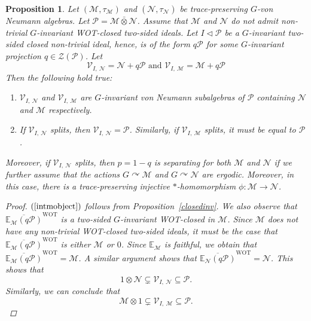 \documentclass[12pt]{amsart}
\newtheorem{proposition}[thm]{Proposition}
\theoremstyle{definition}
\begin{document}
\begin{proposition}
\label{objectassociatedwithanideal}
Let $(\mathcal{M},\tau_{\mathcal{M}})$ and $(\mathcal{N},\tau_{\mathcal{N}})$ be trace-preserving $G$-von Neumann algebras. Let $\mathcal{P}=\mathcal{M}\bar{\otimes}\mathcal{N}$. Assume that $\mathcal{M}$ and $\mathcal{N}$ do not admit non-trivial $G$-invariant WOT-closed two-sided ideals. Let $I\triangleleft \mathcal{P}$ be a $G$-invariant two-sided closed non-trivial ideal, hence, is of the form $q\mathcal{P}$ for some $G$-invariant projection $q\in\mathcal{Z}(\mathcal{P})$. Let\[\mathcal{V}_{I,~\mathcal{N}}=\mathcal{N}+q\mathcal{P}\text{ and }\mathcal{V}_{I,~\mathcal{M}}=\mathcal{M}+q\mathcal{P}\]
Then the following hold true:
\begin{enumerate}
    \item\label{intmobject} $\mathcal{V}_{I,~\mathcal{N}}$ and  $\mathcal{V}_{I,~\mathcal{M}}$ are $G$-invariant von Neumann subalgebras of $\mathcal{P}$ containing $\mathcal{N}$ and $\mathcal{M}$ respectively.
    \item\label{spliteverything} If $\mathcal{V}_{I,~\mathcal{N}}$ splits, then $\mathcal{V}_{I,~\mathcal{N}}=\mathcal{P}$. Similarly, if $\mathcal{V}_{I,~\mathcal{M}}$ splits, it must be equal to $\mathcal{P}$. 
\end{enumerate}
Moreover, if $\mathcal{V}_{I,~\mathcal{N}}$ splits, then $p=1-q$ is separating for both $\mathcal{M}$ and $\mathcal{N}$ if we further assume that the actions $G\curvearrowright \mathcal{M}$ and $G\curvearrowright\mathcal{N}$ are ergodic. Moreover, in this case, there is a trace-preserving injective $*$-homomorphism $\phi: \mathcal{M}\to\mathcal{N}$.
\begin{proof}
$(\ref{intmobject})$ follows from Proposition~\ref{closedinv}. We also observe that $\overline{\mathbb{E}_{\mathcal{M}}(q\mathcal{P})}^{\text{WOT}}$ is a two-sided $G$-invariant WOT-closed in $\mathcal{M}$. Since $\mathcal{M}$ does not have any non-trivial WOT-closed two-sided ideals, it must be the case that  $\overline{\mathbb{E}_{\mathcal{M}}(q\mathcal{P})}^{\text{WOT}}$ is either $\mathcal{M}$ or $0$. Since $\mathbb{E}_{\mathcal{M}}$ is faithful, we obtain that $\overline{\mathbb{E}_{\mathcal{M}}(q\mathcal{P})}^{\text{WOT}}=\mathcal{M}$. A similar argument shows that $\overline{\mathbb{E}_{\mathcal{N}}(q\mathcal{P})}^{\text{WOT}}=\mathcal{N}$. This shows that $$1\otimes\mathcal{N}\subsetneq\mathcal{V}_{I,~\mathcal{N}}\subseteq\mathcal{P}.$$ Similarly, we can conclude that $$\mathcal{M}\otimes 1\subsetneq\mathcal{V}_{I,~\mathcal{M}}\subseteq\mathcal{P}.$$

\end{proof}
\end{proposition}
\end{document}
